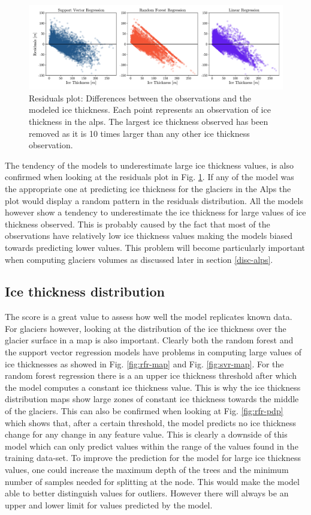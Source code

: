\begin{figure}[!tp]
	\centering		  
	\includegraphics[width=1.\textwidth]{figures/residuals_plot.pdf}
	\caption{Residuals plot: Differences between the observations and the modeled ice thickness. Each point represents an observation of ice thickness in the alps. The largest ice thickness observed has been removed as it is 10 times larger than any other ice thickness observation.}
	\label{fig:residuals}
\end{figure}

The tendency of the models to underestimate large ice thickness values, is also confirmed when looking at the residuals plot in Fig. \ref{fig:residuals}. If any of the model was the appropriate one at predicting ice thickness for the glaciers in the Alps the plot would display a random pattern in the residuals distribution. All the models however show a tendency to underestimate the ice thickness for large values of ice thickness observed. This is probably caused by the fact that most of the observations have relatively low ice thickness values making the models biased towards predicting lower values. This problem will become particularly important when computing glaciers volumes as discussed later in section \ref{disc-alps}.

\subsection{Ice thickness distribution}\label{disc-vol-dist}
The score is a great value to assess how well the model replicates known data. For glaciers however, looking at the distribution of the ice thickness over the glacier surface in a map is also important. Clearly both the random forest and the support vector regression models have problems in computing large values of ice thicknesses as showed in Fig. \ref{fig:rfr-map} and Fig. \ref{fig:svr-map}. For the random forest regression there is a an upper ice thickness threshold after which the model computes a constant ice thickness value. This is why the ice thickness distribution maps show large zones of constant ice thickness towards the middle of the glaciers. This can also be confirmed when looking at Fig. \ref{fig:rfr-pdp} which shows that, after a certain threshold, the model predicts no ice thickness change for any change in any feature value. This is clearly a downside of this model which can only predict values within the range of the values found in the training data-set. To improve the prediction for the model for large ice thickness values, one could increase the maximum depth of the trees and the minimum number of samples needed for splitting at the node. This would make the model able to better distinguish values for outliers. However there will always be an upper and lower limit for values predicted by the model.

